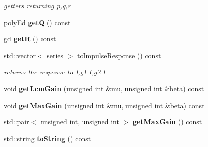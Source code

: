 \begin{DoxyCompactItemize}
\begin{DoxyCompactList}\small\item\em getters returning p,q,r \end{DoxyCompactList}\item 
\mbox{\label{classetvo_i_i_1_1series_ed_ad90c31e6dbebebeb4a0b90f8eaefcbb3}} 
\mbox{\hyperlink{classetvo_i_i_1_1poly_ed}{poly\+Ed}} {\bfseries getQ} () const
\item 
\mbox{\label{classetvo_i_i_1_1series_ed_a6e314faaf87083611f2ff8280d27215d}} 
\mbox{\hyperlink{classetvo_i_i_1_1gd}{gd}} {\bfseries getR} () const
\item 
\mbox{\label{classetvo_i_i_1_1series_ed_a6d9e0bd2502b34c4ca3e6156dd880a33}} 
std\+::vector$<$ \mbox{\hyperlink{classetvo_i_i_1_1series}{series}} $>$ \mbox{\hyperlink{classetvo_i_i_1_1series_ed_a6d9e0bd2502b34c4ca3e6156dd880a33}{to\+Impulse\+Response}} () const
\begin{DoxyCompactList}\small\item\em returns the response to I,g1.\+I,g2.\+I ... \end{DoxyCompactList}\item 
\mbox{\label{classetvo_i_i_1_1series_ed_adb6266ee8770bfbc37617f2c8f75d5e4}} 
void {\bfseries get\+Lcm\+Gain} (unsigned int \&mu, unsigned int \&beta) const
\item 
\mbox{\label{classetvo_i_i_1_1series_ed_ab325dce008db1e7d336a1a750389f6ec}} 
void {\bfseries get\+Max\+Gain} (unsigned int \&mu, unsigned int \&beta) const
\item 
\mbox{\label{classetvo_i_i_1_1series_ed_a677f9e04ac56ce4cfae890e1d1e65b4a}} 
std\+::pair$<$ unsigned int, unsigned int $>$ {\bfseries get\+Max\+Gain} () const
\item 
\mbox{\label{classetvo_i_i_1_1series_ed_a770bdaa263a47076abae16b8c080f13f}} 
std\+::string {\bfseries to\+String} () const
\item 
\mbox{\label{classetvo_i_i_1_1series_ed_a7afcc7b2231dad36b3f1be4ad7cd2335}} 

\end{DoxyCompactItemize}
